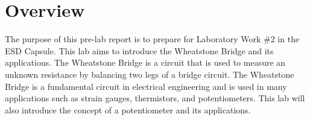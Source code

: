 \chapter{Overview}

The purpose of this pre-lab report is to prepare for Laboratory Work \#2 in the ESD Capsule. This lab aims to introduce the Wheatstone Bridge and its applications. The Wheatstone Bridge is a circuit that is used to measure an unknown resistance by balancing two legs of a bridge circuit. The Wheatstone Bridge is a fundamental circuit in electrical engineering and is used in many applications such as strain gauges, thermistors, and potentiometers. This lab will also introduce the concept of a potentiometer and its applications. 
